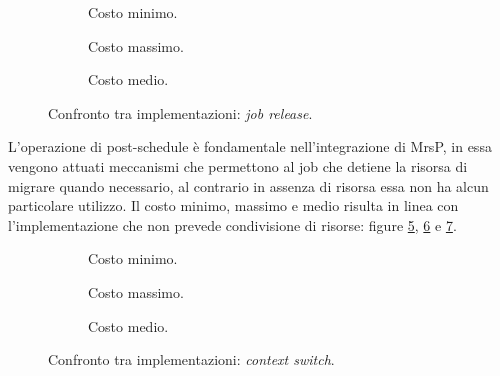  \begin{figure}[htb]
    \centering
      \begin{subfigure}[b]{0.49\textwidth}
        \centering
        \resizebox{\linewidth}{!}\graficoReleaseMIN  
        \caption{Costo minimo.}
        \label{fig:releaseMin}
      \end{subfigure}
      \begin{subfigure}[b]{0.49\textwidth}
        \centering
        \resizebox{\linewidth}{!}\graficoReleaseMAX
        \caption{Costo massimo.}
        \label{fig:releaseMax}
      \end{subfigure}
      \begin{subfigure}[b]{0.49\textwidth}
        \centering
        \resizebox{\linewidth}{!}\graficoReleaseAVG
        \caption{Costo medio.}
        \label{fig:releaseAvg}
      \end{subfigure}

    \caption{Confronto tra implementazioni: \textit{job release}.}
    \label{fig:release}
  \end{figure}
        
\noindent L'operazione di post-schedule è fondamentale nell'integrazione di MrsP, in essa vengono attuati meccanismi che permettono al job che detiene la risorsa di migrare quando necessario, al contrario in assenza di risorsa essa non ha alcun particolare utilizzo. Il costo minimo, massimo e medio risulta in linea con l'implementazione che non prevede condivisione di risorse: figure \ref{fig:cxsMin}, \ref{fig:cxsMax} e \ref{fig:cxsAvg}.\\

  \begin{figure}[htb]
    \centering
      \begin{subfigure}[b]{0.49\textwidth}
        \centering
        \resizebox{\linewidth}{!}\graficoCxsMIN  
        \caption{Costo minimo.}
        \label{fig:cxsMin}
      \end{subfigure}
      \begin{subfigure}[b]{0.49\textwidth}
        \centering
        \resizebox{\linewidth}{!}\graficoCxsMAX
        \caption{Costo massimo.}
        \label{fig:cxsMax}
      \end{subfigure}
      \begin{subfigure}[b]{0.49\textwidth}
        \centering
        \resizebox{\linewidth}{!}\graficoCxsAVG
        \caption{Costo medio.}
        \label{fig:cxsAvg}
      \end{subfigure}

    \caption{Confronto tra implementazioni: \textit{context switch}.}
    \label{fig:cxs}
  \end{figure}

